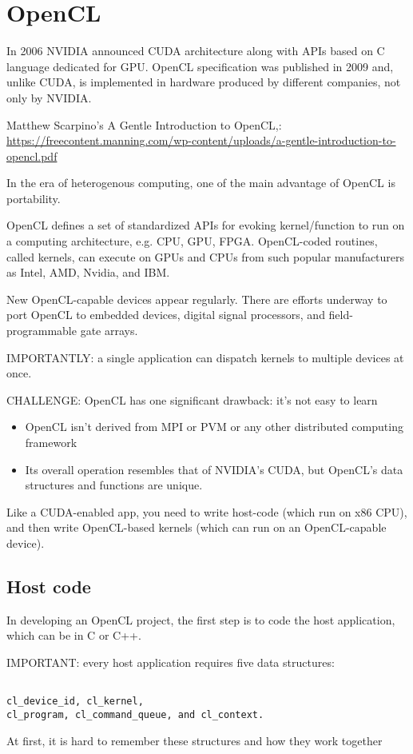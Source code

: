 \chapter{OpenCL}

In 2006 NVIDIA announced CUDA architecture along with APIs based on C language
dedicated for GPU. OpenCL specification was published in 2009 and, unlike CUDA,
is implemented in hardware produced by different companies, not only by NVIDIA.



Matthew Scarpino's A Gentle Introduction to OpenCL,:
\url{https://freecontent.manning.com/wp-content/uploads/a-gentle-introduction-to-opencl.pdf}

In the era of heterogenous computing, one of the main advantage of OpenCL is portability.

OpenCL defines a set of standardized APIs for evoking kernel/function to run on
a computing architecture, e.g. CPU, GPU, FPGA.
OpenCL-coded routines, called kernels, can execute on GPUs and CPUs from such
popular manufacturers as Intel, AMD, Nvidia, and IBM.


New OpenCL-capable devices appear regularly.
There are efforts underway to port OpenCL to embedded devices, digital signal
processors, and field-programmable gate arrays.

IMPORTANTLY: a single application can dispatch kernels to multiple devices at
once.

CHALLENGE: OpenCL has one significant drawback: it’s not easy to learn

\begin{itemize}
  \item   OpenCL isn’t derived
from MPI or PVM or any other distributed computing framework

   \item  Its overall operation resembles that of NVIDIA’s
CUDA, but OpenCL’s data structures and functions are unique.
\end{itemize}

Like a CUDA-enabled app, you need to write host-code (which run on x86 CPU), and
then write OpenCL-based kernels (which can run on an OpenCL-capable device).

\section{Host code}

In developing an OpenCL project, the first step is to code the host application, which can be in C or C++.

IMPORTANT:
every host application requires five data structures: 
\begin{verbatim}

cl_device_id, cl_kernel,
cl_program, cl_command_queue, and cl_context.

\end{verbatim}

At first, it  is hard to remember these structures and how they work together
 
